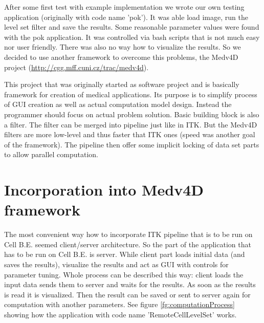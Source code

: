 \par
After some first test with example implementation we wrote our own testing application (originally with code name 'pok').
It was able load image, run the level set filter and save the results.
Some reasonable parameter values were found with the pok application.
It was controlled via bash scripts that is not much easy nor user friendly.
There was also no way how to visualize the results.
So we decided to use another framework to overcome this problems, the Medv4D project (\url{http://cgg.mff.cuni.cz/trac/medv4d}).

\par
This project that was originally started as software project and is basically framework for creation of medical applications.
Its purpose is to simplify process of GUI creation as well as actual computation model design.
Instead the programmer should focus on actual problem solution.
Basic building block is also a filter.
The filter can be merged into pipeline just like in ITK.
But the Medv4D filters are more low-level and thus faster that ITK ones (speed was another goal of the framework).
The pipeline then offer some implicit locking of data set parts to allow parallel computation.

\section{Incorporation into Medv4D framework}

\par
The most convenient way how to incorporate ITK pipeline that is to be run on Cell B.E. seemed client/server architecture.
So the part of the application that has to be run on Cell B.E. is server.
While client part loads initial data (and saves the results), visualize the results and act as GUI with controls for parameter tuning.
Whole process can be described this way: client loads the input data sends them to server and waits for the results.
As soon as the results is read it is visualized.
Then the result can be saved or sent to server again for computation with another parameters.
See figure \ref{fg:computationProcess} showing how the application with code name 'RemoteCellLevelSet' works.

